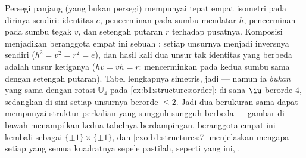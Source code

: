 \begin{example}\label{ex:b1:structures:klein}
Persegi panjang (yang bukan persegi) mempunyai tepat empat isometri pada
dirinya sendiri: identitas $e$, pencerminan pada sumbu mendatar $h$,
pencerminan pada sumbu tegak $v$, dan setengah putaran $r$ terhadap
pusatnya. Komposisi menjadikan  beranggota empat ini sebuah : setiap
unsurnya menjadi inversnya sendiri ($h^2 = v^2 = r^2 = e$), dan
hasil kali dua unsur tak identitas yang berbeda adalah unsur ketiganya
($hv = vh = r$: mencerminkan pada kedua sumbu sama dengan setengah putaran). Tabel
lengkapnya simetris, jadi   --- namun ia
\emph{bukan}  yang sama dengan  rotasi $\mathbb U_4$ pada
\cref{ex:b1:structures:order}: di sana $\iu$ berorde $4$, sedangkan
di sini setiap unsurnya berorde $\leq 2$. Jadi dua  berukuran sama
dapat mempunyai struktur perkalian yang sungguh-sungguh berbeda
--- gambar di bawah menampilkan kedua tabelnya berdampingan. 
beranggota empat ini kembali sebagai $\{\pm1\} \times \{\pm1\}$, dan
\cref{exo:b1:structures:7} menjelaskan mengapa setiap  yang semua
kuadratnya sepele pastilah, seperti yang ini, .
\end{example}

